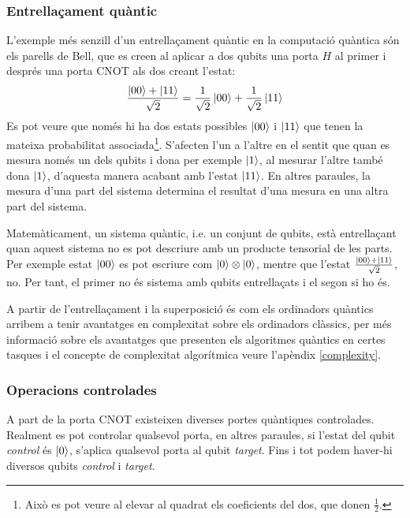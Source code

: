 \subsubsection{Entrellaçament quàntic}
L'exemple més senzill d'un entrellaçament quàntic en la computació quàntica són els parells de Bell, que es creen al aplicar a dos qubits una porta $H$ al primer i després una porta $\mathrm{CNOT}$ als dos creant l'estat:
$$
\frac{\ket{00}+\ket{11}}{\sqrt{2}} = \frac{1}{\sqrt{2}}\ket{00} + \frac{1}{\sqrt{2}}\ket{11}
$$
Es pot veure que només hi ha dos estats possibles $\ket{00}$ i $\ket{11}$ que tenen la mateixa probabilitat associada\footnote{Això es pot veure al elevar al quadrat els coeficients del dos, que donen $\frac{1}{2}$.}. S'afecten l'un a l'altre en el sentit que quan es mesura només un dels qubits i dona per exemple $\ket{1}$, al mesurar l'altre també dona $\ket{1}$, d'aquesta manera acabant amb l'estat $\ket{11}$. En altres paraules, la mesura d'una part del sistema determina el resultat d'una mesura en una altra part del sistema.

Matemàticament, un sistema quàntic, i.e. un conjunt de qubits, està entrellaçant quan aquest sistema no es pot descriure amb un producte tensorial de les parts. Per exemple estat $\ket{00}$ es pot escriure com $\ket{0}\otimes\ket{0}$, mentre que l'estat $\frac{\ket{00} + \ket{11}}{\sqrt{2}}$, no. Per tant, el primer no és sistema amb qubits entrellaçats i el segon si ho és.

A partir de l'entrellaçament i la superposició és com els ordinadors quàntics arribem a tenir avantatges en complexitat sobre els ordinadors clàssics, per més informació sobre els avantatges que presenten els algoritmes quàntics en certes tasques i el concepte de complexitat algorítmica veure l'apèndix \ref{complexity}.

\subsubsection{Operacions controlades}
A part de la porta $\mathrm{CNOT}$ existeixen diverses portes quàntiques controlades. Realment es pot controlar qualsevol porta, en altres paraules, si l'estat del qubit \textit{control} és $\ket{0}$, s'aplica qualsevol porta al qubit \textit{target}. Fins i tot podem haver-hi diversos qubits \textit{control} i \textit{target}.

